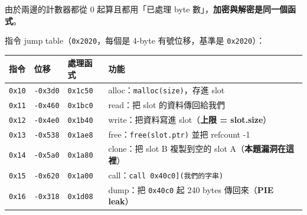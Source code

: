 \documentclass[10pt,a4paper]{article}
\newcounter{none}
\begin{document}
由於兩邊的計數器都從 0 起算且都用「已處理 byte
數」，\textbf{加密與解密是同一個函式}。

指令 jump table（\texttt{0x2020}，每個是 4-byte 有號位移，基準是
\texttt{0x2020}）：

{\def\LTcaptype{none} %
\begin{longtable}[]{@{}
  >{\raggedright\arraybackslash}p{}
  >{\raggedright\arraybackslash}p{}
  >{\raggedright\arraybackslash}p{}
  >{\raggedright\arraybackslash}p{}@{}}
\toprule\noalign{}
\begin{minipage}[b]{\linewidth}\raggedright
指令
\end{minipage} & \begin{minipage}[b]{\linewidth}\raggedright
位移
\end{minipage} & \begin{minipage}[b]{\linewidth}\raggedright
處理函式
\end{minipage} & \begin{minipage}[b]{\linewidth}\raggedright
功能
\end{minipage} \\
\midrule\noalign{}
\endhead
\bottomrule\noalign{}
\endlastfoot
\texttt{0x10} & \texttt{-\allowbreak{}0x3d0} & \texttt{0x1c50} &
alloc：\texttt{malloc(size)}，存進 slot \\
\texttt{0x11} & \texttt{-\allowbreak{}0x460} & \texttt{0x1bc0} & read：把 slot
的資料傳回給我們 \\
\texttt{0x12} & \texttt{-\allowbreak{}0x4e0} & \texttt{0x1b40} & write：把資料寫進
slot（\textbf{上限 = slot.size}） \\
\texttt{0x13} & \texttt{-\allowbreak{}0x538} & \texttt{0x1ae8} &
free：\texttt{free(slot.\allowbreak{}ptr)} 並把 refcount -1 \\
\texttt{0x14} & \texttt{-\allowbreak{}0x5a0} & \texttt{0x1a80} & clone：把 slot B
複製到空的 slot A（\textbf{本題漏洞在這裡}） \\
\texttt{0x15} & \texttt{-\allowbreak{}0x620} & \texttt{0x1a00} &
call：\texttt{call\ \allowbreak{}{[}0x40c0{]}(我們的字串)} \\
\texttt{0x16} & \texttt{-\allowbreak{}0x318} & \texttt{0x1d08} & dump：把
\texttt{0x40c0} 起 240 bytes 傳回來（\textbf{PIE leak}） \\
\end{longtable}
}
\end{document}
